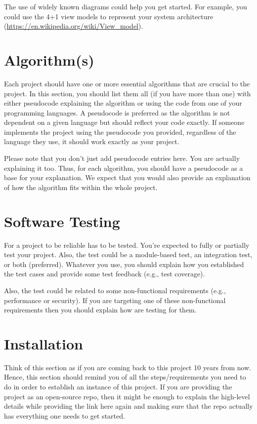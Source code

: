 The use of widely known diagrams could help you get started. For example, you could use the 4+1 view models to represent your system architecture (\url{https://en.wikipedia.org/wiki/View_model}).


\section{Algorithm(s)} %
\label{sec:algorihtms}

Each project should have one or more essential algorithms that are crucial to the project. In this section, you should list them all (if you have more than one) with either pseudocode explaining the algorithm or using the code from one of your programming languages. A pseudocode is preferred as the algorithm is not dependent on a given language but should reflect your code exactly. If someone implements the project using the pseudocode you provided, regardless of the language they use, it should work exactly as your project. 

Please note that you don't just add pseudocode entries here. You are actually explaining it too. Thus, for each algorithm, you should have a pseudocode as a base for your explanation. We expect that you would also provide an explanation of how the algorithm fits within the whole project.


\section{Software Testing} %
\label{sec:software-testing}

For a project to be reliable has to be tested. You're expected to fully or partially test your project. Also, the test could be a module-based test, an integration test, or both (preferred). Whatever you use, you should explain how you established the test cases and provide some test feedback (e.g., test coverage).

Also, the test could be related to some non-functional requirements (e.g., performance or security). If you are targeting one of these non-functional requirements then you should explain how are testing for them.


\section{Installation} %
\label{sec:installation}

Think of this section as if you are coming back to this project 10 years from now. Hence, this section should remind you of all the steps/requirements you need to do in order to establish an instance of this project. If you are providing the project as an open-source repo, then it might be enough to explain the high-level details while providing the link here again and making sure that the repo actually has everything one needs to get started.


